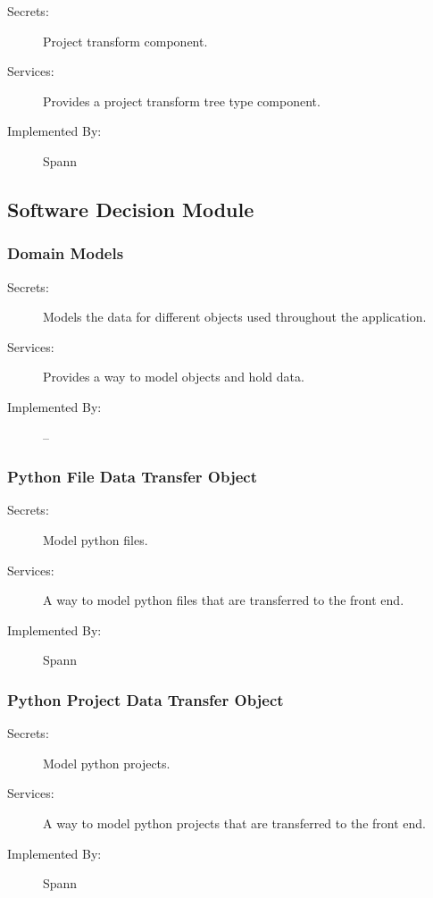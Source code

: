 \documentclass[12pt, titlepage]{article}
\begin{document}
\begin{description}
\item[Secrets:] Project transform component.
\item[Services:] Provides a project transform tree type component.
\item[Implemented By:] Spann
\end{description}



\subsection{Software Decision Module}

\subsubsection{Domain Models}

\begin{description}
\item[Secrets:] Models the data for different objects used throughout the
    application.
\item[Services:] Provides a way to model objects and hold data.
\item[Implemented By:] --
\end{description}

\subsubsection{Python File Data Transfer Object}

\begin{description}
\item[Secrets:] Model python files.
\item[Services:] A way to model python files that are transferred to the front
    end.
\item[Implemented By:] Spann
\end{description}

\subsubsection{Python Project Data Transfer Object}

\begin{description}
\item[Secrets:] Model python projects.
\item[Services:] A way to model python projects that are transferred to the front
    end.
\item[Implemented By:] Spann
\end{description}
\end{document}
